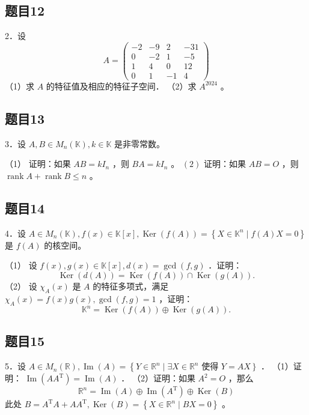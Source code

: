 \documentclass{article}
\begin{document}
\subsection{题目12}
2．设
\[
A=\left(\begin{array}{cccc}
-2 & -9 & 2 & -31 \\
0 & -2 & 1 & -5 \\
1 & 4 & 0 & 12 \\
0 & 1 & -1 & 4
\end{array}\right)
\]
（1）求 \(A\) 的特征值及相应的特征子空间．
（2）求 \(A^{2024}\) 。

\subsection{题目13}
3．设 \(A, B \in M_{n}(\mathbb{K}), k \in \mathbb{K}\) 是非零常数。

（1） 证明：如果 \(A B=k I_{n}\) ，则 \(B A=k I_{n}\) 。
\((2)\) 证明：如果 \(A B=O\) ，则 \(\operatorname{rank} A+\operatorname{rank} B \leq n\) 。

\subsection{题目14}
4．设 \(A \in M_{n}(\mathbb{K}), f(x) \in \mathbb{K}[x], \operatorname{Ker}(f(A))=\left\{X \in \mathbb{K}^{n} \mid f(A) X=0\right\}\) 是 \(f(A)\) 的核空间。

（1） 设 \(f(x), g(x) \in \mathbb{K}[x], d(x)=\operatorname{gcd}(f, g)\) ．证明：
\[
\operatorname{Ker}(d(A))=\operatorname{Ker}(f(A)) \cap \operatorname{Ker}(g(A)) .
\]
（2） 设 \(\chi_{A}(x)\) 是 \(A\) 的特征多项式，满足 \(\chi_{A}(x)=f(x) g(x), \operatorname{gcd}(f, g)=1\) ，证明：
\[
\mathbb{K}^{n}=\operatorname{Ker}(f(A)) \oplus \operatorname{Ker}(g(A)) .
\]

\subsection{题目15}
5．设 \(A \in M_{n}(\mathbb{R}), \operatorname{Im}(A)=\left\{Y \in \mathbb{R}^{n} \mid \exists X \in \mathbb{R}^{n}\right.\) 使得 \(\left.Y=A X\right\}\) ．
（1）证明： \(\operatorname{Im}\left(A A^{\mathrm{T}}\right)=\operatorname{Im}(A)\) ．
（2）证明：如果 \(A^{2}=O\) ，那么
\[
\mathbb{R}^{n}=\operatorname{Im}(A) \oplus \operatorname{Im}\left(A^{\mathrm{T}}\right) \oplus \operatorname{Ker}(B)
\]
此处 \(B=A^{\mathrm{T}} A+A A^{\mathrm{T}}, \operatorname{Ker}(B)=\left\{X \in \mathbb{R}^{n} \mid B X=0\right\}\) 。
\end{document}
